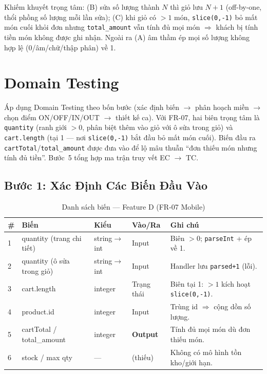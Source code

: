 \documentclass[12pt, a4paper]{report}
\begin{document}
\begin{notebox}
Khiếm khuyết trọng tâm: (B) sửa số lượng thành $N$ thì giỏ lưu $N+1$ (off-by-one, thổi
phồng số lượng mỗi lần sửa); (C) khi giỏ có $>1$ món, \texttt{slice(0,-1)} bỏ mất
món cuối khỏi đơn nhưng \texttt{total\_amount} vẫn tính đủ mọi món $\Rightarrow$ khách bị tính
tiền món không được ghi nhận. Ngoài ra (A) âm thầm ép mọi số lượng không hợp lệ
(0/âm/chữ/thập phân) về 1.
\end{notebox}

\section{Domain Testing}

Áp dụng Domain Testing theo bốn bước (xác định biến $\to$ phân hoạch miền
$\to$ chọn điểm ON/OFF/IN/OUT $\to$ thiết kế ca). Với FR-07, hai biên trọng tâm là
\texttt{quantity} (ranh giới $>0$, phân biệt thêm vào giỏ với ô sửa trong giỏ) và
\texttt{cart.length} (tại 1 --- nơi \texttt{slice(0,-1)} bắt đầu bỏ mất món cuối). Biến đầu ra
\texttt{cartTotal}/\texttt{total\_amount} được đưa vào để lộ mâu thuẫn ``đơn thiếu món nhưng tính
đủ tiền''. Bước~5 tổng hợp ma trận truy vết EC $\to$ TC.

\subsection{Bước 1: Xác Định Các Biến Đầu Vào}
\begin{table}[H]
    \centering
    \caption{Danh sách biến — Feature D (FR-07 Mobile)}
    \begin{tabularx}{\linewidth}{C{0.5cm} L{3.2cm} L{2.6cm} C{1.8cm} X}
        \toprule
        \textbf{\#} & \textbf{Biến} & \textbf{Kiểu} & \textbf{Vào/Ra} & \textbf{Ghi chú} \\
         & quantity (trang chi tiết) & string$\to$int & Input & Biên $>0$; \texttt{parseInt} + ép về 1. \\
        2 & quantity (ô sửa trong giỏ) & string$\to$int & Input & Handler lưu \texttt{parsed+1} (lỗi). \\
        3 & cart.length & integer & Trạng thái & Biên tại 1: $>1$ kích hoạt \texttt{slice(0,-1)}. \\
        4 & product.id & integer & Input & Trùng id $\Rightarrow$ cộng dồn số lượng. \\
        5 & cartTotal / total\_amount & integer & \textbf{Output} & Tính đủ mọi món dù đơn thiếu món. \\
        6 & stock / max qty & --- & (thiếu) & Không có mô hình tồn kho/giới hạn. \\
        \bottomrule
    \end{tabularx}
\end{table}
\end{document}
